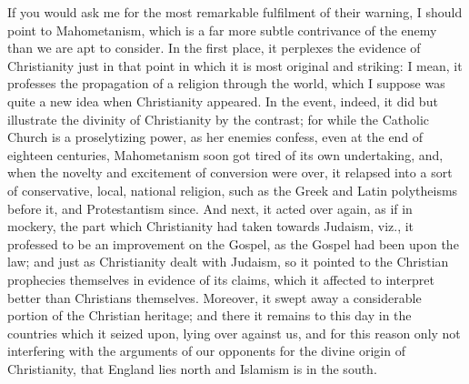 If you would ask me for the most remarkable fulfilment of their
warning, I should point to Mahometanism, which is a far more subtle
contrivance of the enemy than we are apt to consider. In the first
place, it perplexes the evidence of Christianity just in that point in
which it is most original and striking: I mean, it professes the
propagation of a religion through the world, which I suppose was quite
a new idea when Christianity appeared. In the event, indeed, it did
but illustrate the divinity of Christianity by the contrast; for while
the Catholic Church is a proselytizing power, as her enemies confess,
even at the end of eighteen centuries, Mahometanism soon got tired of
its own undertaking, and, when the novelty and excitement of
conversion were over, it relapsed into a sort of conservative, local,
national religion, such as the Greek and Latin polytheisms before it,
and Protestantism since. And next, it acted over again, as if in
mockery, the part which Christianity had taken towards Judaism, viz.,
it professed to be an improvement on the Gospel, as the Gospel had
been upon the law; and just as Christianity dealt with Judaism, so it
pointed to the Christian prophecies themselves in evidence of its
claims, which it affected to interpret better than Christians
themselves. Moreover, it swept away a considerable portion of the
Christian heritage; and there it remains to this day in the countries
which it seized upon, lying over against us, and for this reason only
not interfering with the arguments of our opponents for the divine
origin of Christianity, that England lies north and Islamism is in the
south.

